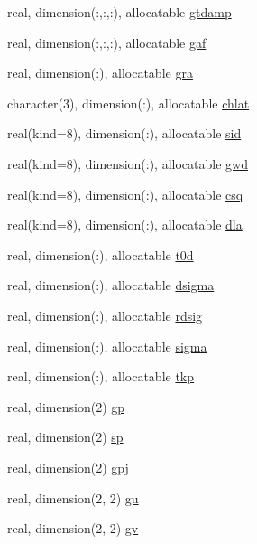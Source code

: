 \begin{DoxyCompactItemize}
\item 
real, dimension(\-:,\-:,\-:), allocatable \hyperlink{classpumamod_afde0b96dd53a26b1703595f64071516d}{gtdamp}
\item 
real, dimension(\-:,\-:,\-:), allocatable \hyperlink{classpumamod_a7b5ac8c859782a4cc38346f7b9a61dcd}{gaf}
\item 
real, dimension(\-:), allocatable \hyperlink{classpumamod_a5cb12da2095a04506c22df1b670575f6}{gra}
\item 
character(3), dimension(\-:), \*
allocatable \hyperlink{classpumamod_a657def2270ed1f8c5137ba82b1d2cb69}{chlat}
\item 
real(kind=8), dimension(\-:), \*
allocatable \hyperlink{classpumamod_afaa36786d595931f29f0eb93f01ed83d}{sid}
\item 
real(kind=8), dimension(\-:), \*
allocatable \hyperlink{classpumamod_af7724a88a5fba5e0ea4a278eca324b7b}{gwd}
\item 
real(kind=8), dimension(\-:), \*
allocatable \hyperlink{classpumamod_a5be628a4dc3f151cd3a2500954bd707a}{csq}
\item 
real(kind=8), dimension(\-:), \*
allocatable \hyperlink{classpumamod_af689f39b83711b2d5c805279eb5391c1}{dla}
\item 
real, dimension(\-:), allocatable \hyperlink{classpumamod_a2ce41df1b8a64f3eb8788faa374977e7}{t0d}
\item 
real, dimension(\-:), allocatable \hyperlink{classpumamod_a11d50c855ac5c212c04a3640ddfa362d}{dsigma}
\item 
real, dimension(\-:), allocatable \hyperlink{classpumamod_af7f7c6447115a5e0079679528c5e20af}{rdsig}
\item 
real, dimension(\-:), allocatable \hyperlink{classpumamod_a645a8743bd64422c6d0b4dfc7182fa23}{sigma}
\item 
real, dimension(\-:), allocatable \hyperlink{classpumamod_af17f19dbdc2165bfaca19bed26fd393d}{tkp}
\item 
real, dimension(2) \hyperlink{classpumamod_ac97014556deaf23263381f8f385e24bf}{gp}
\item 
real, dimension(2) \hyperlink{classpumamod_a7ca052eca893b2dd15b3e2c59417383b}{sp}
\item 
real, dimension(2) \hyperlink{classpumamod_a7e9cb053d22629a087d9fb20373d6845}{gpj}
\item 
real, dimension(2, 2) \hyperlink{classpumamod_af0504dba05d1852caaa89cc26864d4c1}{gu}
\item 
real, dimension(2, 2) \hyperlink{classpumamod_a2c2f72279b235e6fabc99913fed1f718}{gv}

\end{DoxyCompactItemize}
